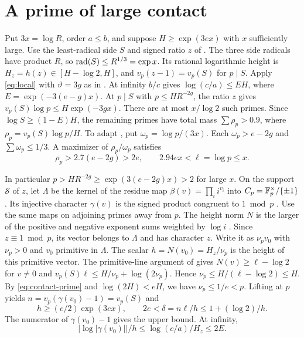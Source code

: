 \section{A prime of large contact}\label{sec:contact}

Put $3x=\log R$, order $a\le b$, and suppose $H\ge\exp(3ex)$ with $x$ sufficiently large.
Use the least-radical side $S$ and signed ratio $z$ of \cite[Section~2]{Z29}.
The three side radicals have product $R$, so $\operatorname{rad}(S)\le R^{1/3}=\exp x$.
Its rational logarithmic height is $H_z=h(z)\in[H-\log2,H]$, and
$v_p(z-1)=v_p(S)$ for $p\mid S$.
Apply \eqref{eq:local} with $\vartheta=3g$ as in
\cite[Propositions~3.1 and~4.1]{Z29}. At infinity $b/c$ gives
$\log(c/a)\le EH$, where $E=\exp(-3(e-g)x)$.
At $p\mid S$ with $p\le HR^{-2g}$, the ratio $z$ gives
$v_p(S)\log p\le H\exp(-3gx)$. There are at most $x/\log2$ such primes.
Since $\log S\ge(1-E)H$, the remaining primes have total mass
$\sum\rho_p>0.9$, where $\rho_p=v_p(S)\log p/H$.
To adapt \cite[Proposition~5.1]{Z29}, put $\omega_p=\log p/(3x)$.
Each $\omega_p>e-2g$ and $\sum\omega_p\le1/3$. A maximizer of
$\rho_p/\omega_p$ satisfies
\begin{equation}\label{eq:contact-prime}
 \rho_p>2.7(e-2g)>2e,\qquad 2.94ex<\ell=\log p\le x .
\end{equation}

In particular $p>HR^{-2g}\ge\exp(3(e-2g)x)>2$ for large $x$.
On the support $\mathcal S$ of $z$, let $\Lambda$ be the kernel of the residue
map $\beta(v)=\prod_i i^{v_i}$ into $C_p=\mathbb F_p^\times/\{\pm1\}$.
Its injective character $\gamma(v)$ is the signed product congruent to $1\bmod p$
\cite[Section~6]{Z29}. Use the same maps on adjoining primes away from $p$.
The height norm $N$ is the larger of the positive and negative exponent sums
weighted by $\log i$ \cite[Lemma~7.2, (7.4)]{Z29}.
Since $z\equiv1\bmod p$, its vector belongs to $\Lambda$ and has character $z$.
Write it as $\nu_pv_0$ with $\nu_p>0$ and $v_0$ primitive in $\Lambda$.
The scalar $h=N(v_0)=H_z/\nu_p$ is the height of this primitive vector.
The primitive-line argument of \cite[proof of Proposition~6.1]{Z29} gives
$N(v)\ge\ell-\log2$ for $v\ne0$ and
$v_p(S)\ell\le H/\nu_p+\log(2\nu_p)$.
Hence $\nu_p\le H/(\ell-\log2)\le H$.
By \eqref{eq:contact-prime} and $\log(2H)<eH$, we have $\nu_p\le1/e<p$.
Lifting at $p$ yields $n=v_p(\gamma(v_0)-1)=v_p(S)$ and
\begin{equation}\label{eq:contact-height}
 h\ge(e/2)\exp(3ex),\qquad
 2e<\delta=n\ell/h\le1+(\log2)/h .
\end{equation}
The numerator of $\gamma(v_0)-1$ gives the upper bound. At infinity,
\[
 |\log|\gamma(v_0)||/h\le\log(c/a)/H_z\le2E .
\]

